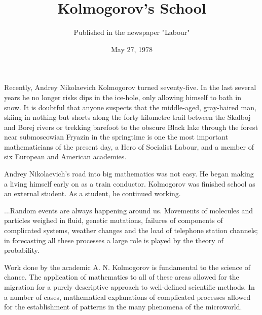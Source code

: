 \documentclass{article}
\begin{document}
\title{Kolmogorov's School}
\date{May 27, 1978}
\author{Published in the newspaper "Labour"}
\maketitle
Recently, Andrey Nikolaevich Kolmogorov turned seventy-five.
In the last several years he no longer risks dips in the ice-hole, only allowing himself to bath in snow.
It is doubtful that anyone suspects that the middle-aged, gray-haired man, skiing in nothing but shorts along the forty kilometre trail between the Skalboj and Borej rivers or trekking barefoot to the obscure Black lake through the forest near submoscowian Fryazin in the springtime is one the most important mathematicians of the present day, a Hero of Socialist Labour, and a member of six European and American academies.

Andrey Nikolaevich's road into big mathematics was not easy.
He began making a living himself early on as a train conductor. Kolmogorov was finished school as an external student.
As a student, he continued working.

...Random events are always happening around us.
Movements of molecules and particles weighed in fluid, genetic mutations, failures of components of complicated systems, weather changes and the load of telephone station channels; in forecasting all these processes a large role is played by the theory of probability.

Work done by the academic A. N. Kolmogorov is fundamental to the science of chance.
The application of mathematics to all of these areas allowed for the migration for a purely descriptive approach to well-defined scientific methods.
In a number of cases, mathematical explanations of complicated processes allowed for the establishment of patterns in the many phenomena of the microworld.
\end{document}
